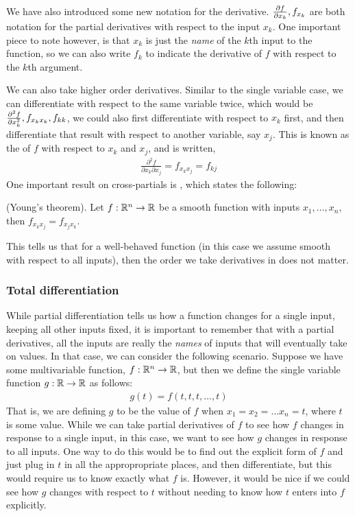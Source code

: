 We have also introduced some new notation for the derivative. $\frac{\partial f}{\partial x_k}, f_{x_k}$ are both notation for the partial derivatives with respect to the input $x_k$. One important piece to note however, is that $x_k$ is just the \emph{name} of the $k$th input to the function, so we can also write $f_k$ to indicate the derivative of $f$ with respect to the $k$th argument. 

We can also take higher order derivatives. Similar to the single variable case, we can differentiate with respect to the same variable twice, which would be $\frac{\partial ^2 f}{\partial x_k^2}, f_{x_k x_k}, f_{kk}$, we could also first differentiate with respect to $x_k$ first, and then differentiate that result with respect to another variable, say $x_j$. This is known as the  of $f$ with respect to $x_k$ and $x_j$, and is written,
\begin{align*}
    \frac{\partial^2 f}{\partial x_k \partial x_j} = f_{x_k x_j} = f_{kj}
\end{align*}
One important result on cross-partials is , which states the following:
\begin{theorem*}
    (Young's theorem). Let $f: \mathbb{R}^n \to \mathbb{R}$ be a smooth function with inputs $x_1, \dots, x_n$, then $f_{x_k x_j} = f_{x_j x_k}$. 
\end{theorem*}
This tells us that for a well-behaved function (in this case we assume smooth with respect to all inputs), then the order we take derivatives in does not matter. 


\subsubsection*{Total differentiation}
While partial differentiation tells us how a function changes for a single input, keeping all other inputs fixed, it is important to remember that with a partial derivatives, all the inputs are really the \emph{names} of inputs that will eventually take on values. In that case, we can consider the following scenario. Suppose we have some multivariable function, $f: \mathbb{R}^n \to \mathbb{R}$, but then we define the single variable function $g: \mathbb{R} \to \mathbb{R}$ as follows:
\begin{align*}
    g(t) = f(t, t, t, \dots, t)
\end{align*}
That is, we are defining $g$ to be the value of $f$ when $x_1 = x_2 = \dots x_n = t$, where $t$ is some value. While we can take partial derivatives of $f$ to see how $f$ changes in response to a single input, in this case, we want to see how $g$ changes in response to all inputs. One way to do this would be to find out the explicit form of $f$ and just plug in $t$ in all the appropropriate places, and then differentiate, but this would require us to know exactly what $f$ is. However, it would be nice if we could see how $g$ changes with respect to $t$ without needing to know how $t$ enters into $f$ explicitly. 

